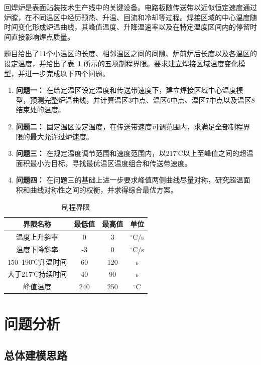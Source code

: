 \documentclass{cumcmthesis}
\begin{document}
回焊炉是表面贴装技术生产线中的关键设备。电路板随传送带以近似恒定速度通过炉膛，在不同温区中经历预热、升温、回流和冷却等过程。焊接区域的中心温度随时间变化形成炉温曲线，其峰值温度、升降温速率以及在特定温度区间内的停留时间直接影响焊点质量。

题目给出了11个小温区的长度、相邻温区之间的间隙、炉前炉后长度以及各温区的设定温度，并给出了表~\ref{tab:process} 所示的五项制程界限。要求建立焊接区域温度变化模型，并进一步完成以下四个问题。

\begin{enumerate}
    \item \textbf{问题一：} 在给定温区设定温度和传送带速度下，建立焊接区域中心温度模型，预测完整炉温曲线，并计算温区3中点、温区6中点、温区7中点以及温区8结束处的温度。
    \item \textbf{问题二：} 固定温区设定温度，在传送带速度可调范围内，求满足全部制程界限的最大允许过炉速度。
    \item \textbf{问题三：} 在规定温度调节范围和速度范围内，以217℃以上至峰值之间的超温面积最小为目标，寻找最优温区温度组合和传送带速度。
    \item \textbf{问题四：} 在问题三的基础上进一步要求峰值两侧曲线尽量对称，研究超温面积和曲线对称性之间的权衡，并求得综合最优方案。
\end{enumerate}

\begin{table}[H]
\centering
\caption{制程界限}
\label{tab:process}
\begin{tabular}{cccc}
\toprule
界限名称 & 最低值 & 最高值 & 单位\\
\midrule
温度上升斜率 & 0 & 3 & ${}^\circ$C/s\\
温度下降斜率 & -3 & 0 & ${}^\circ$C/s\\
150--190℃升温时间 & 60 & 120 & s\\
大于217℃持续时间 & 40 & 90 & s\\
峰值温度 & 240 & 250 & ${}^\circ$C\\
\bottomrule
\end{tabular}
\end{table}

\section{问题分析}

\subsection{总体建模思路}
\end{document}
